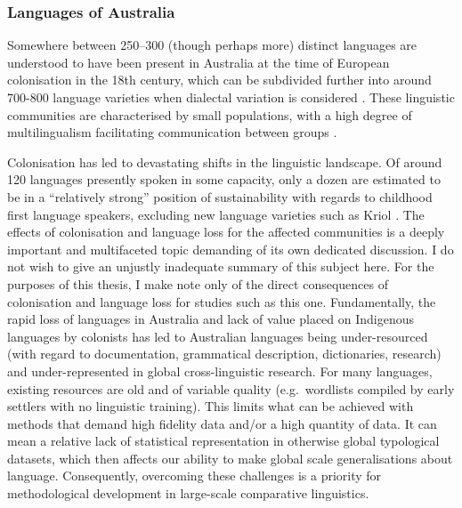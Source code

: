 \hypertarget{languages-of-australia}{%
\subsubsection{Languages of Australia}\label{languages-of-australia}}

Somewhere between 250--300 (though perhaps more) distinct languages are understood to have been present in Australia at the time of European colonisation in the 18th century, which can be subdivided further into around 700-800 language varieties when dialectal variation is considered \autocite{koch_languages_2014}. These linguistic communities are characterised by small populations, with a high degree of multilingualism facilitating communication between groups \autocite{koch_languages_2014}.

Colonisation has led to devastating shifts in the linguistic landscape. Of around 120 languages presently spoken in some capacity, only a dozen are estimated to be in a ``relatively strong'' position of sustainability with regards to childhood first language speakers, excluding new language varieties such as Kriol \autocite[p.~42]{australian_government_department_of_infrastructure_transport_regional_development_and_communications_national_2020}. The effects of colonisation and language loss for the affected communities is a deeply important and multifaceted topic demanding of its own dedicated discussion. I do not wish to give an unjustly inadequate summary of this subject here. For the purposes of this thesis, I make note only of the direct consequences of colonisation and language loss for studies such as this one. Fundamentally, the rapid loss of languages in Australia and lack of value placed on Indigenous languages by colonists has led to Australian languages being under-resourced (with regard to documentation, grammatical description, dictionaries, research) and under-represented in global cross-linguistic research. For many languages, existing resources are old and of variable quality (e.g.~wordlists compiled by early settlers with no linguistic training). This limits what can be achieved with methods that demand high fidelity data and/or a high quantity of data. It can mean a relative lack of statistical representation in otherwise global typological datasets, which then affects our ability to make global scale generalisations about language. Consequently, overcoming these challenges is a priority for methodological development in large-scale comparative linguistics.

